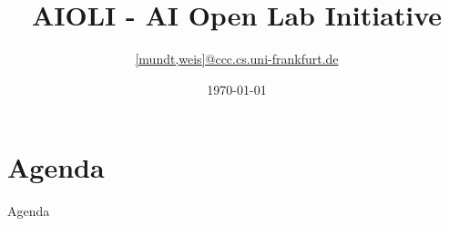 \documentclass[aspectratio=169]{beamer}
\title{AIOLI - AI Open Lab Initiative}
\date{\today}
\author{\texorpdfstring{\url{[mundt,weis]@ccc.cs.uni-frankfurt.de}}{Tobias Weis}}
\institute{Systems Engineering for Computer Vision}
\begin{document}
{
\maketitle}


\section{Agenda}
	\begin{frame}{Agenda}
		\tableofcontents

	\end{frame}
\end{document}
